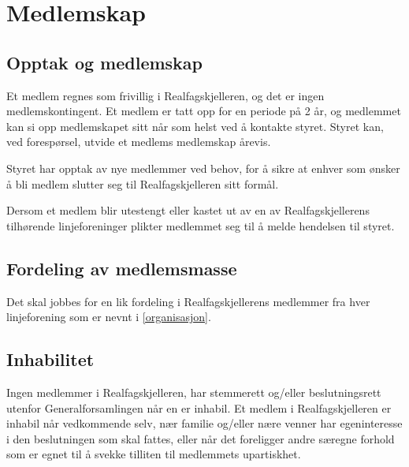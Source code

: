 \section{Medlemskap} \label{medlemskap}

\subsection{Opptak og medlemskap} \label{opptak og medlemskap}

Et medlem regnes som frivillig i Realfagskjelleren, og det er ingen medlemskontingent.
Et medlem er tatt opp for en periode på 2 år, og medlemmet kan si opp medlemskapet sitt når som helst ved å kontakte styret.
Styret kan, ved forespørsel, utvide et medlems medlemskap årevis.

Styret har opptak av nye medlemmer ved behov, for å sikre at enhver som ønsker å bli medlem slutter seg til Realfagskjelleren sitt formål.

Dersom et medlem blir utestengt eller kastet ut av en av Realfagskjellerens tilhørende linjeforeninger plikter medlemmet seg til å melde hendelsen til styret.

\subsection{Fordeling av medlemsmasse} \label{fordeling av medlemsmasse}

Det skal jobbes for en lik fordeling i Realfagskjellerens medlemmer fra hver linjeforening som er nevnt i \ref{organisasjon}.

\subsection{Inhabilitet} \label{inhabilitet}

Ingen medlemmer i Realfagskjelleren, har stemmerett og/eller beslutningsrett utenfor Generalforsamlingen når en er inhabil. 
Et medlem i Realfagskjelleren er inhabil når vedkommende selv, nær familie og/eller nære venner har egeninteresse i den beslutningen som skal fattes, eller når det foreligger andre særegne forhold som er egnet til å svekke tilliten til medlemmets upartiskhet.